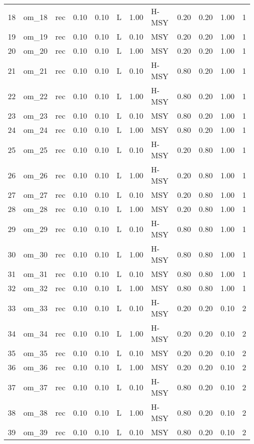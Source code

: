 \begin{table}[ht]
{\begin{tabular}{rllrrlrlrrrr}
  18 & om\_18 & rec & 0.10 & 0.10 & L & 1.00 & H-MSY & 0.20 & 0.20 & 1.00 &   1 \\ 
  19 & om\_19 & rec & 0.10 & 0.10 & L & 0.10 & MSY & 0.20 & 0.20 & 1.00 &   1 \\ 
  20 & om\_20 & rec & 0.10 & 0.10 & L & 1.00 & MSY & 0.20 & 0.20 & 1.00 &   1 \\ 
  21 & om\_21 & rec & 0.10 & 0.10 & L & 0.10 & H-MSY & 0.80 & 0.20 & 1.00 &   1 \\ 
  22 & om\_22 & rec & 0.10 & 0.10 & L & 1.00 & H-MSY & 0.80 & 0.20 & 1.00 &   1 \\ 
  23 & om\_23 & rec & 0.10 & 0.10 & L & 0.10 & MSY & 0.80 & 0.20 & 1.00 &   1 \\ 
  24 & om\_24 & rec & 0.10 & 0.10 & L & 1.00 & MSY & 0.80 & 0.20 & 1.00 &   1 \\ 
  25 & om\_25 & rec & 0.10 & 0.10 & L & 0.10 & H-MSY & 0.20 & 0.80 & 1.00 &   1 \\ 
  26 & om\_26 & rec & 0.10 & 0.10 & L & 1.00 & H-MSY & 0.20 & 0.80 & 1.00 &   1 \\ 
  27 & om\_27 & rec & 0.10 & 0.10 & L & 0.10 & MSY & 0.20 & 0.80 & 1.00 &   1 \\ 
  28 & om\_28 & rec & 0.10 & 0.10 & L & 1.00 & MSY & 0.20 & 0.80 & 1.00 &   1 \\ 
  29 & om\_29 & rec & 0.10 & 0.10 & L & 0.10 & H-MSY & 0.80 & 0.80 & 1.00 &   1 \\ 
  30 & om\_30 & rec & 0.10 & 0.10 & L & 1.00 & H-MSY & 0.80 & 0.80 & 1.00 &   1 \\ 
  31 & om\_31 & rec & 0.10 & 0.10 & L & 0.10 & MSY & 0.80 & 0.80 & 1.00 &   1 \\ 
  32 & om\_32 & rec & 0.10 & 0.10 & L & 1.00 & MSY & 0.80 & 0.80 & 1.00 &   1 \\ 
  33 & om\_33 & rec & 0.10 & 0.10 & L & 0.10 & H-MSY & 0.20 & 0.20 & 0.10 &   2 \\ 
  34 & om\_34 & rec & 0.10 & 0.10 & L & 1.00 & H-MSY & 0.20 & 0.20 & 0.10 &   2 \\ 
  35 & om\_35 & rec & 0.10 & 0.10 & L & 0.10 & MSY & 0.20 & 0.20 & 0.10 &   2 \\ 
  36 & om\_36 & rec & 0.10 & 0.10 & L & 1.00 & MSY & 0.20 & 0.20 & 0.10 &   2 \\ 
  37 & om\_37 & rec & 0.10 & 0.10 & L & 0.10 & H-MSY & 0.80 & 0.20 & 0.10 &   2 \\ 
  38 & om\_38 & rec & 0.10 & 0.10 & L & 1.00 & H-MSY & 0.80 & 0.20 & 0.10 &   2 \\ 
  39 & om\_39 & rec & 0.10 & 0.10 & L & 0.10 & MSY & 0.80 & 0.20 & 0.10 &   2 \\ 

\end{tabular}}
\end{table}
